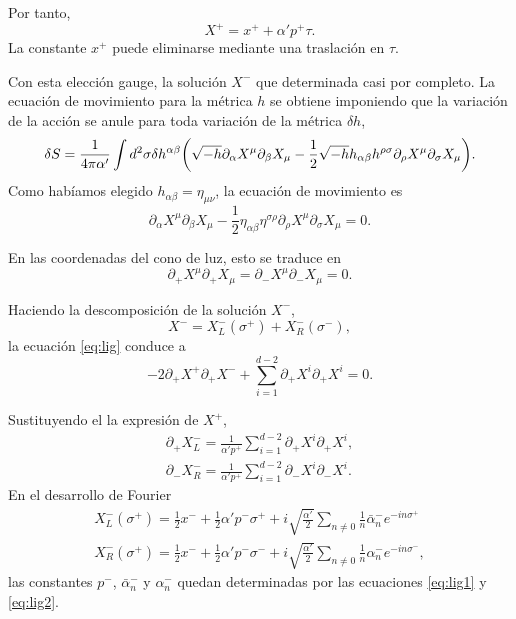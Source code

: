 Por tanto, 
\begin{equation}
  X^+ = x^+ + \alpha' p^+ \tau.
\end{equation}
La constante $x^+$ puede eliminarse mediante una traslación en $\tau$.

Con esta elección gauge, la solución $X^-$ que determinada casi por completo.
La ecuación de movimiento para la métrica $h$ se obtiene imponiendo que la variación de la acción
se anule para toda variación de la métrica $\delta h$,
\begin{equation}
  \delta S = \frac{1}{4\pi\alpha'}\int d^2\sigma \delta h^{\alpha\beta}
  \qty(
  \sqrt{-h}\partial_\alpha X^\mu \partial_\beta X_\mu -
  \frac 1 2 \sqrt{-h}h_{\alpha\beta}h^{\rho\sigma} \partial_\rho X^\mu \partial_\sigma X_\mu).
\end{equation}
Como habíamos elegido $h_{\alpha\beta}=\eta_{\mu\nu}$, la ecuación de movimiento es
\begin{equation}
  \partial_\alpha X^\mu \partial_\beta X_\mu - \frac 1 2 \eta_{\alpha\beta} \eta^{\sigma\rho} 
  \partial_\rho X^\mu  \partial_\sigma X_\mu = 0.
\end{equation}

En las coordenadas del cono de luz, esto se traduce en
\begin{equation}
  \partial_+ X^\mu \partial_+ X_\mu = \partial_- X^\mu \partial_- X_\mu = 0.
  \label{eq:lig}
\end{equation}

Haciendo la descomposición de la solución $X^-$,
\begin{equation}
  X^-=X^-_L(\sigma^+)+X^-_R(\sigma^-),
\end{equation}
la ecuación \ref{eq:lig} conduce a 
\begin{equation}
  -2\partial_+ X^+ \partial_+ X^- + \sum_{i=1}^{d-2} \partial_+ X^i \partial_+ X^i = 0.
\end{equation}

Sustituyendo el la expresión de $X^+$,
\begin{align}
  \partial_+ X_L^- = \frac{1}{\alpha'p^+}\sum_{i=1}^{d-2} \partial_+ X^i \partial_+ X^i, \label{eq:lig1}\\
  \partial_- X_R^- = \frac{1}{\alpha'p^+}\sum_{i=1}^{d-2} \partial_- X^i \partial_- X^i. \label{eq:lig2}
\end{align}
En el desarrollo de Fourier
\begin{equation}
  \begin{gathered}
    X^-_L(\sigma^+)=\frac 1 2 x^- + \frac 1 2 \alpha' p^- \sigma^+ + i\sqrt{\frac{ \alpha'}{ 2}}
    \sum_{n\neq0} \frac 1 n \bar{\alpha}^-_n e^{-in\sigma^+} \\                             
    X^-_R(\sigma^+)=\frac 1 2 x^- + \frac 1 2 \alpha' p^- \sigma^- + i\sqrt{\frac{ \alpha'}{ 2}}
    \sum_{n\neq0} \frac 1 n \alpha^-_n e^{-in\sigma^-},
  \end{gathered}
\end{equation}
las constantes $p^-$, $\bar \alpha^-_n$ y $\alpha^-_n$ quedan determinadas por las ecuaciones
\ref{eq:lig1} y \ref{eq:lig2}.

